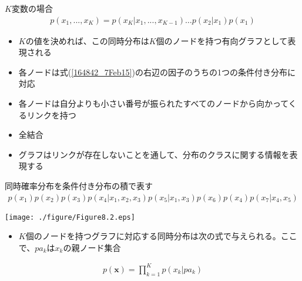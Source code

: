 \begin{frame}{$K$変数の場合}
 \begin{eqnarray}
  p(x_1,...,x_K) = p(x_K|x_1,...,x_{K-1})\dots p(x_2|x_1)p(x_1)\label{164842_7Feb15}
 \end{eqnarray}
 \begin{itemize}
  \item $K$の値を決めれば、この同時分布は$K$個のノードを持つ有向グラフとして表現される
  \item 各ノードは式(\ref{164842_7Feb15})の右辺の因子のうちの1つの条件付き分布に対応
  \item 各ノードは自分よりも小さい番号が振られたすべてのノードから向かってくるリンクを持つ
  \item 全結合
  \item グラフはリンクが存在しないことを通して、分布のクラスに関する情報を表現する
 \end{itemize}
\end{frame}

\begin{frame}{同時確率分布を条件付き分布の積で表す}
 \begin{eqnarray*}
  p(x_1)p(x_2)p(x_3)p(x_4|x_1,x_2,x_3)p(x_5|x_1,x_3)p(x_6)p(x_4)p(x_7|x_4,x_5)
 \end{eqnarray*}
 \begin{center}
  \texttt{[image: ./figure/Figure8.2.eps]}
 \end{center}
 \begin{itemize}
  \item $K$個のノードを持つグラフに対応する同時分布は次の式で与えられる。ここで、$pa_k$は$x_k$の親ノード集合
 \end{itemize}
 \begin{eqnarray*}
  p(\bm{x}) = \prod_{k=1}^{K}p(x_k|pa_k)
 \end{eqnarray*}
\end{frame}

